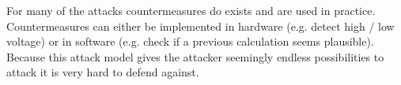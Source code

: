 For many of the attacks countermeasures do exists and are used in practice. Countermeasures can either be implemented in hardware (e.g. detect high / low voltage) or in software (e.g. check if a previous calculation seems plausible).
Because this attack model gives the attacker seemingly endless possibilities to attack it is very hard to defend against.

